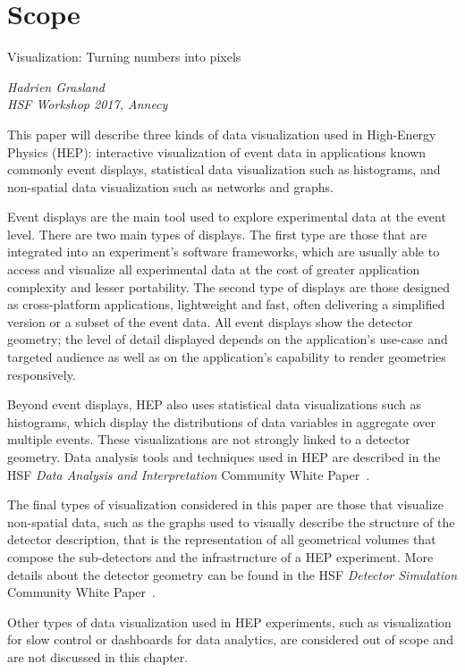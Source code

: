 \documentclass[12pt,a4paper]{article}
\begin{document}
\newpage


\hypertarget{scope}{%
\section{Scope}\label{scope}}

\epigraph{Visualization: Turning numbers into pixels}{\textit{Hadrien Grasland \\ HSF Workshop 2017, Annecy}}

This paper will describe three kinds of data visualization used in High-Energy Physics (HEP): interactive visualization of event data in
applications known commonly event displays, statistical data visualization such as histograms,
and non-spatial data visualization such as networks and graphs.

Event displays are the main tool used to explore experimental data at the event level.
There are two main types of displays. The first type are those that are integrated into an experiment's software frameworks,
which are usually able to access and visualize all experimental data at the cost of greater application complexity and lesser portability.
The second type of displays are those designed as cross-platform applications, lightweight and fast, often
delivering a simplified version or a subset of the event data. All event displays show the detector geometry; the level of detail
displayed depends on the application's use-case and targeted audience as well as on the application's capability to
render geometries responsively.

Beyond event displays, HEP also uses statistical data visualizations such as histograms, which display the distributions of data variables
in aggregate over multiple events. These visualizations are not strongly linked to a detector geometry. Data
analysis tools and techniques used in HEP are
described in the HSF \textit{Data Analysis and Interpretation} Community White Paper~\cite{HSF-CWP-2017-05}.

The final types of visualization considered in this paper are those that visualize non-spatial data, such as the graphs used to
visually describe the structure of the detector description, that is
the representation of all geometrical volumes that compose the sub-detectors and the infrastructure of a HEP experiment.
More details about the detector geometry can be found in the HSF \textit{Detector Simulation} Community White Paper~\cite{HSF-CWP-2017-07}.

Other types of data visualization used in HEP experiments, such as visualization for slow control
or dashboards for data analytics, are considered out of scope and are not discussed in this chapter.
\end{document}
